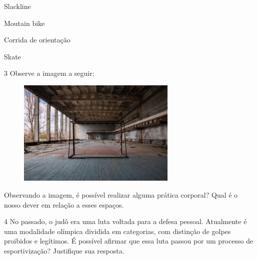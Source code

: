 \begin{boxlist}

 Slackline

 Moutain bike

 Corrida de orientação

 Skate
\end{boxlist}


\num{3} Observe a imagem a seguir:

\begin{figure}[htpb!]
\includegraphics[width=2.99444in,height=1.99477in]{./imgs/img1.jpg}
\end{figure}

Observando a imagem, é possível realizar alguma prática corporal? Qual é
o nosso dever em relação a esses espaços.


\num{4} No passado, o judô era uma luta voltada para a defesa pessoal.
  Atualmente é uma modalidade olímpica dividida em categorias, com 
  distinção de golpes proibidos e legítimos. É possível afirmar que essa
  luta passou por um processo de esportivização? Justifique sua
  resposta.

